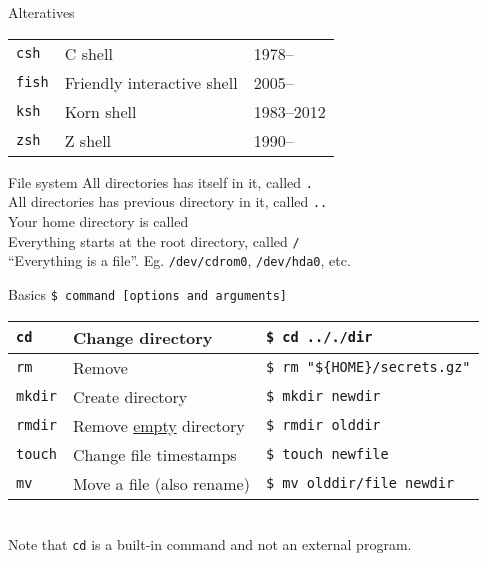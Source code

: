 \documentclass{beamer}
\let\tt\texttt
\let\ul\underline
\begin{document}
\begin{frame}{Alteratives}
        \begin{tabular}{p{} p{} p{}}
                \tt{csh}        & C shell   & 1978--  \\
                \tt{fish}       & Friendly interactive shell &  2005-- \\
                \tt{ksh}        & Korn shell & 1983--2012 \\
                \tt{zsh}        & Z shell & 1990--  \\
        \end{tabular}
\end{frame}

\begin{frame}{File system}
        All directories has itself in it, called \tt{.}                \\
        All directories has previous directory in it, called \tt{..}   \\
        Your home directory is called \tt{~}                           \\
        Everything starts at the root directory, called \tt{/}         \\
        ``Everything is a file''. Eg. \tt{/dev/cdrom0}, \tt{/dev/hda0}, etc.
\end{frame}

\begin{frame}{Basics}
        \tt{\$ command [options and arguments]}  \\
        \begin{tabular}{p{} p{} | p{}}
                \hline
                \tt{cd}           &
                Change directory  &
                \tt{\$ cd .././dir}  \\
                \hline
                \tt{rm}           &
                Remove &
                \tt{\$ rm "\$\{HOME\}/secrets.gz"}  \\
                \hline
                \tt{mkdir}           &
                Create directory &
                \tt{\$ mkdir newdir}  \\
                \hline
                \tt{rmdir}           &
                Remove \ul{empty} directory &
                \tt{\$ rmdir olddir}  \\
                \hline
                \tt{touch}               &
                Change file timestamps   &
                \tt{\$ touch newfile}       \\
                \hline
                \tt{mv}                     &
                Move a file (also rename)   &
                \tt{\$ mv olddir/file newdir}  \\
                \hline
        \end{tabular} \\
        Note that \tt{cd} is a built-in command and not an external program.
\end{frame}
\end{document}
